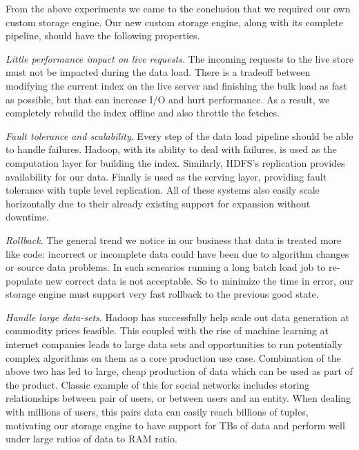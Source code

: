 From the above experiments we came to the conclusion that we required
our own custom storage engine. Our new custom storage engine, along
with its complete pipeline, should have the following properties. 
\begin{compactitem}
\item \emph{Little performance impact on live requests}. The incoming
requests to the live store must not be impacted during the data load.
There is a tradeoff between modifying the current index on the live
server and finishing the bulk load as fast as possible, but that can
increase I/O and hurt performance. As a result, we completely rebuild
the index offline and also throttle the fetches. 
\item \emph{Fault tolerance and scalability}. Every step of the data
load pipeline should be able to handle failures. Hadoop, with its
ability to deal with failures, is used as the computation layer for
building the index. Similarly, HDFS's replication provides
availability for our data. Finally \projectname{} is used as the 
serving layer, providing fault tolerance with tuple level replication. 
All of these systems also easily scale horizontally due to
their already existing support for expansion without downtime. 
\item \emph{Rollback}. The general trend we notice in our business
that data is treated more like code: incorrect or incomplete data
could have been due to algorithm changes or source data problems. 
In such scnearios running a long batch load job to re-populate new
correct data is not acceptable. So to minimize the time in error, 
our storage engine must support very fast rollback to the previous 
good state.
\item \emph{Handle large data-sets}. Hadoop has successfully help
scale out data generation at commodity prices feasible.
This coupled with the rise of machine learning at internet companies 
leads to large data sets and opportunities to run potentially complex 
algorithms on them as a core production use case. Combination of 
the above two has led to large, cheap production of data which can 
be used as part of the product. Classic example of this for social 
networks includes storing relationships between pair of users,
or between users and an entity. When dealing with millions of users, 
this pairs data can easily reach billions of tuples, motivating
our storage engine to have support for TBs of data and perform 
well under large ratios of data to RAM ratio.
\end{compactitem}

